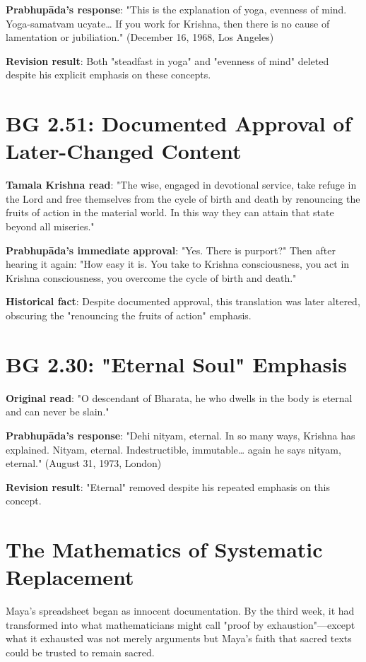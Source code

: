 \documentclass[11pt,twoside]{book}
\begin{document}
\textbf{\textbf{Prabhupāda's response}}: "This is the explanation of yoga, evenness of mind. Yoga-samatvam ucyate\ldots{} If you work for Krishna, then there is no cause of lamentation or jubiliation." (December 16, 1968, Los Angeles)

\textbf{\textbf{Revision result}}: Both "steadfast in yoga" and "evenness of mind" deleted despite his explicit emphasis on these concepts.
\section*{BG 2.51: Documented Approval of Later-Changed Content}
\label{sec:orgecc8a62}
\textbf{\textbf{Tamala Krishna read}}: "The wise, engaged in devotional service, take refuge in the Lord and free themselves from the cycle of birth and death by renouncing the fruits of action in the material world. In this way they can attain that state beyond all miseries."

\textbf{\textbf{Prabhupāda's immediate approval}}: "Yes. There is purport?" Then after hearing it again: "How easy it is. You take to Krishna consciousness, you act in Krishna consciousness, you overcome the cycle of birth and death."

\textbf{\textbf{Historical fact}}: Despite documented approval, this translation was later altered, obscuring the "renouncing the fruits of action" emphasis.
\section*{BG 2.30: "Eternal Soul" Emphasis}
\label{sec:org95770ca}
\textbf{\textbf{Original read}}: "O descendant of Bharata, he who dwells in the body is eternal and can never be slain."

\textbf{\textbf{Prabhupāda's response}}: "Dehi nityam, eternal. In so many ways, Krishna has explained. Nityam, eternal. Indestructible, immutable\ldots{} again he says nityam, eternal." (August 31, 1973, London)

\textbf{\textbf{Revision result}}: "Eternal" removed despite his repeated emphasis on this concept.
\section*{The Mathematics of Systematic Replacement}
\label{sec:org15c996c}

Maya's spreadsheet began as innocent documentation. By the third week, it had transformed into what mathematicians might call "proof by exhaustion"—except what it exhausted was not merely arguments but Maya's faith that sacred texts could be trusted to remain sacred.
\end{document}

